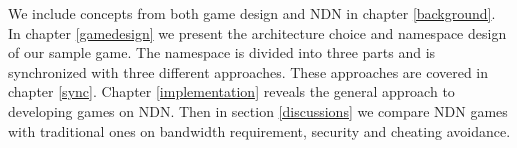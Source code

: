 We include concepts from both game design and NDN in chapter \ref{background}. In chapter \ref{gamedesign} we present the architecture choice and namespace design of our sample game. The namespace is divided into three parts and is synchronized with three different approaches. These approaches are covered in chapter \ref{sync}. Chapter \ref{implementation} reveals the general approach to developing games on NDN. Then in section \ref{discussions} we compare NDN games with traditional ones on bandwidth requirement, security and cheating avoidance.
